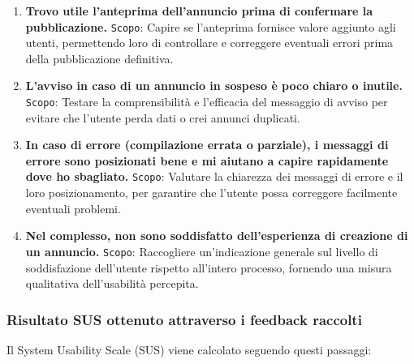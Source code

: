 \begin{enumerate}
    \item \textbf{Trovo utile l’anteprima dell’annuncio prima di confermare la pubblicazione.}
    \newline
    \texttt{Scopo}: Capire se l’anteprima fornisce valore aggiunto agli utenti, permettendo loro di controllare e correggere eventuali errori prima della pubblicazione definitiva.

    \item \textbf{L’avviso in caso di un annuncio in sospeso è poco chiaro o inutile.}
    \newline
    \texttt{Scopo}: Testare la comprensibilità e l’efficacia del messaggio di avviso per evitare che l’utente perda dati o crei annunci duplicati.

    \item \textbf{In caso di errore (compilazione errata o parziale), i messaggi di errore sono posizionati bene e mi aiutano a capire rapidamente dove ho sbagliato.}
    \newline
    \texttt{Scopo}: Valutare la chiarezza dei messaggi di errore e il loro posizionamento, per garantire che l’utente possa correggere facilmente eventuali problemi.

    \item \textbf{Nel complesso, non sono soddisfatto dell’esperienza di creazione di un annuncio.}
    \newline
    \texttt{Scopo}: Raccogliere un’indicazione generale sul livello di soddisfazione dell’utente rispetto all’intero processo, fornendo una misura qualitativa dell’usabilità percepita.
    
\end{enumerate}

\vspace{0.5cm} %
\subsubsection{Risultato SUS ottenuto attraverso i feedback raccolti}
Il System Usability Scale (SUS) viene calcolato seguendo questi passaggi:

